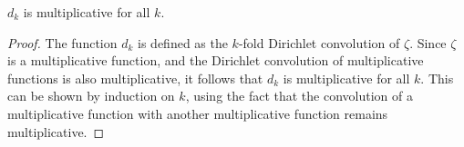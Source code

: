 \begin{theorem}[d isMultiplicative]
\label{d_isMultiplicative}
\leanok
$d_k$ is multiplicative for all $k$.
\end{theorem}
\begin{proof}
\leanok
The function $d_k$ is defined as the $k$-fold Dirichlet convolution of $\zeta$. Since $\zeta$ is a multiplicative function, and the Dirichlet convolution of multiplicative functions is also multiplicative, it follows that $d_k$ is multiplicative for all $k$. This can be shown by induction on $k$, using the fact that the convolution of a multiplicative function with another multiplicative function remains multiplicative.
\end{proof}
